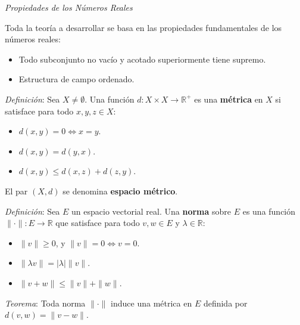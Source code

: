\documentclass{beamer}
\begin{document}
  \begin{frame}
    \textit{Propiedades de los Números Reales}
    \newline\newline

    Toda la teoría a desarrollar se basa en las propiedades fundamentales
    de los números reales:
    \newline
    \begin{itemize}[<+->]
      \item Todo subconjunto no vacío y acotado superiormente tiene supremo.
      \item Estructura de campo ordenado.
    \end{itemize}
  \end{frame}


  \begin{frame}
    \textit{Definición}: Sea $X \neq \emptyset$. Una función 
    $d: X \times X \to \mathbb{R}^+$ es una \textbf{métrica} en 
    $X$ si satisface para todo $x, y, z \in X$:
    \newline

    \begin{itemize}[<+->]
      \item $d(x, y) = 0 \iff x = y$.
      \item $d(x, y) = d(y, x)$.
      \item $d(x, y) \leq d(x, z) + d(z, y)$.
    \end{itemize}

    \pause
    \vspace{0.5em}
    El par $(X, d)$ se denomina \textbf{espacio métrico}.
  \end{frame}

  \begin{frame}
    \textit{Definición}: Sea $E$ un espacio vectorial real. 
    Una \textbf{norma} sobre $E$ es una función $\|\cdot\|: E \to \mathbb{R}$ 
    que satisface para todo $v, w \in E$ y $\lambda \in \mathbb{R}$:
    \newline

    \begin{itemize}[<+->]
      \item $\|v\| \geq 0$, y $\|v\| = 0 \iff v = 0$.
      \item $\|\lambda v\| = |\lambda|\|v\|$.
      \item $\|v + w\| \le \|v\| + \|w\|$.
    \end{itemize}

    \pause
    \vspace{0.5em}
    \textit{Teorema}: Toda norma $\|\cdot\|$ induce una 
    métrica en $E$ definida por $d(v, w) = \|v - w\|$.
  \end{frame}
\end{document}
